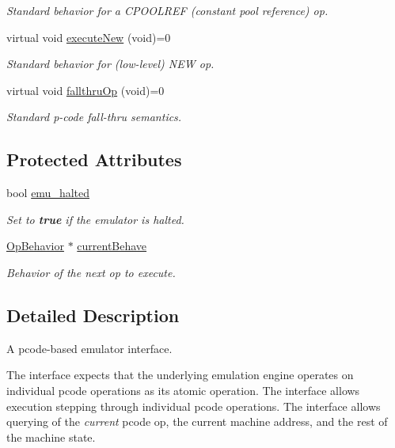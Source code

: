 \begin{DoxyCompactItemize}
\begin{DoxyCompactList}\small\item\em Standard behavior for a C\+P\+O\+O\+L\+R\+EF (constant pool reference) op. \end{DoxyCompactList}\item 
virtual void \mbox{\hyperlink{class_emulate_ad6d1b182791e6d69b6469ea159729372}{execute\+New}} (void)=0
\begin{DoxyCompactList}\small\item\em Standard behavior for (low-\/level) N\+EW op. \end{DoxyCompactList}\item 
virtual void \mbox{\hyperlink{class_emulate_ae9cd5b56525c54479e9c7add4a17687b}{fallthru\+Op}} (void)=0
\begin{DoxyCompactList}\small\item\em Standard p-\/code fall-\/thru semantics. \end{DoxyCompactList}\end{DoxyCompactItemize}
\subsection*{Protected Attributes}
\begin{DoxyCompactItemize}
\item 
bool \mbox{\hyperlink{class_emulate_a8811816cbc0eef9f4cdb856cfd496e94}{emu\+\_\+halted}}
\begin{DoxyCompactList}\small\item\em Set to {\bfseries{true}} if the emulator is halted. \end{DoxyCompactList}\item 
\mbox{\hyperlink{class_op_behavior}{Op\+Behavior}} $\ast$ \mbox{\hyperlink{class_emulate_a1e5d4f8c0ad5c62aa3e723440c5141ca}{current\+Behave}}
\begin{DoxyCompactList}\small\item\em Behavior of the next op to execute. \end{DoxyCompactList}\end{DoxyCompactItemize}


\subsection{Detailed Description}
A pcode-\/based emulator interface. 

The interface expects that the underlying emulation engine operates on individual pcode operations as its atomic operation. The interface allows execution stepping through individual pcode operations. The interface allows querying of the {\itshape current} pcode op, the current machine address, and the rest of the machine state. 

